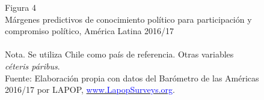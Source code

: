 \documentclass[a4paper]{tufte-handout}
\begin{document}
\begin{figure}[h!]
\captionsetup[subfigure]{labelformat=empty}
  \centering
  \smallskip\noindent\small Figura 4 \\ Márgenes predictivos de conocimiento político para participación y compromiso político, América Latina 2016/17
  \\
  \\ \smallskip\noindent\scriptsize Nota. Se utiliza Chile como país de referencia. Otras variables {\itshape céteris páribus}. \\ Fuente: Elaboración propia con datos del Barómetro de las Américas 2016/17 por LAPOP, \href{https://www.vanderbilt.edu/lapop/}{\textcolor{blue}{www.LapopSurveys.org}}.
\end{figure}
\end{document}
